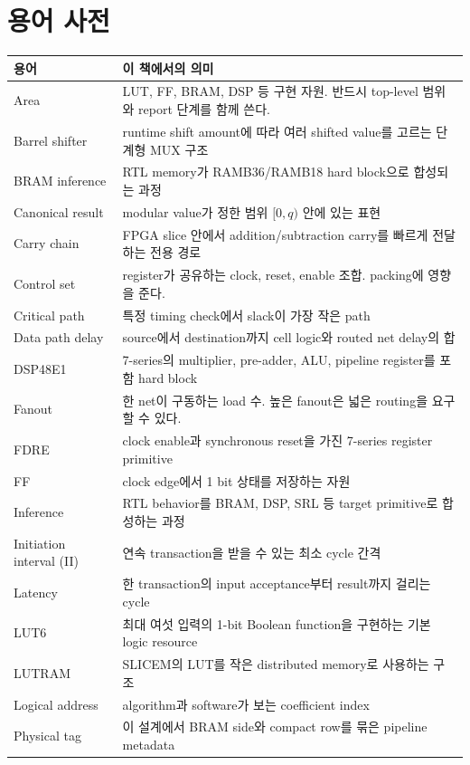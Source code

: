 \chapter{용어 사전}

\begin{longtable}{L{39mm}L{123mm}}
\toprule
용어 & 이 책에서의 의미 \\
\midrule
Area & LUT, FF, BRAM, DSP 등 구현 자원. 반드시 top-level 범위와 report 단계를 함께 쓴다. \\
Barrel shifter & runtime shift amount에 따라 여러 shifted value를 고르는 단계형 MUX 구조 \\
BRAM inference & RTL memory가 RAMB36/RAMB18 hard block으로 합성되는 과정 \\
Canonical result & modular value가 정한 범위 $[0,q)$ 안에 있는 표현 \\
Carry chain & FPGA slice 안에서 addition/subtraction carry를 빠르게 전달하는 전용 경로 \\
Control set & register가 공유하는 clock, reset, enable 조합. packing에 영향을 준다. \\
Critical path & 특정 timing check에서 slack이 가장 작은 path \\
Data path delay & source에서 destination까지 cell logic와 routed net delay의 합 \\
DSP48E1 & 7-series의 multiplier, pre-adder, ALU, pipeline register를 포함 hard block \\
Fanout & 한 net이 구동하는 load 수. 높은 fanout은 넓은 routing을 요구할 수 있다. \\
FDRE & clock enable과 synchronous reset을 가진 7-series register primitive \\
FF & clock edge에서 1 bit 상태를 저장하는 자원 \\
Inference & RTL behavior를 BRAM, DSP, SRL 등 target primitive로 합성하는 과정 \\
Initiation interval (II) & 연속 transaction을 받을 수 있는 최소 cycle 간격 \\
Latency & 한 transaction의 input acceptance부터 result까지 걸리는 cycle \\
LUT6 & 최대 여섯 입력의 1-bit Boolean function을 구현하는 기본 logic resource \\
LUTRAM & SLICEM의 LUT를 작은 distributed memory로 사용하는 구조 \\
Logical address & algorithm과 software가 보는 coefficient index \\
Physical tag & 이 설계에서 BRAM side와 compact row를 묶은 pipeline metadata \\

\end{longtable}
